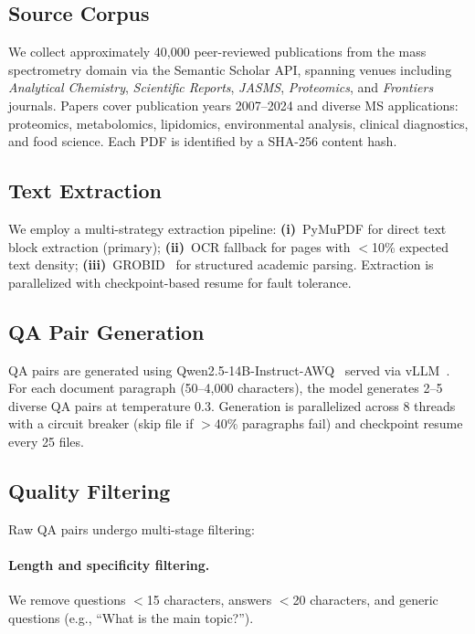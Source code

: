 \documentclass[11pt]{article}
\begin{document}
\subsection{Source Corpus}

We collect approximately 40,000 peer-reviewed publications from the mass
spectrometry domain via the Semantic Scholar
API, spanning venues including \textit{Analytical Chemistry},
\textit{Scientific Reports}, \textit{JASMS}, \textit{Proteomics}, and
\textit{Frontiers} journals. Papers cover publication years 2007--2024 and
diverse MS applications: proteomics, metabolomics, lipidomics, environmental
analysis, clinical diagnostics, and food science. Each PDF is identified by a
SHA-256 content hash.

\subsection{Text Extraction}

We employ a multi-strategy extraction pipeline:
\textbf{(i)}~PyMuPDF for direct text block extraction (primary);
\textbf{(ii)}~OCR fallback for pages with $<$10\% expected text density;
\textbf{(iii)}~GROBID~\citep{lopez2009grobid} for structured academic parsing.
Extraction is parallelized with checkpoint-based resume for fault tolerance.

\subsection{QA Pair Generation}

QA pairs are generated using Qwen2.5-14B-Instruct-AWQ~\citep{qwen2025qwen25}
served via vLLM~\citep{kwon2023efficient}. For each document paragraph
(50--4,000 characters), the model generates 2--5 diverse QA pairs at
temperature 0.3. Generation is parallelized across 8 threads with a circuit
breaker (skip file if $>$40\% paragraphs fail) and checkpoint resume every 25
files.

\subsection{Quality Filtering}

Raw QA pairs undergo multi-stage filtering:

\paragraph{Length and specificity filtering.} We remove questions $<$15
characters, answers $<$20 characters, and generic questions (e.g., ``What is
the main topic?'').
\end{document}
